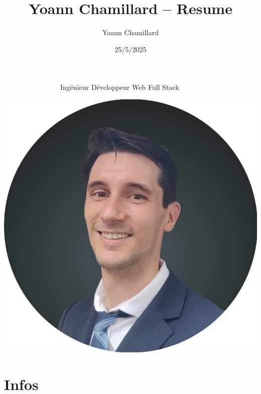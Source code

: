 \documentclass[]{friggeri-cv}
\title{Yoann Chamillard -- Resume}
\author{Yoann Chamillard}
\date{25/5/2025}
\begin{document}
      {~~~~~~~~~~~~~~~~Ingénieur Développeur Web Full Stack}
      {}

\begin{aside}
\hspace{10mm}\includegraphics[scale=0.148]{res/img/Photo_CV.jpg}
\section{Infos}


\end{aside}
\end{document}
